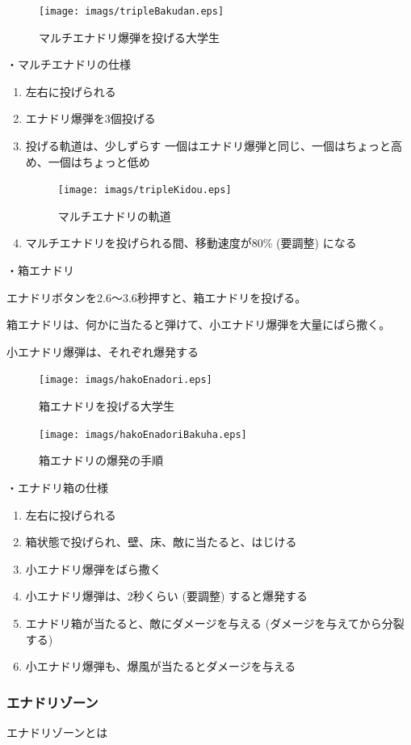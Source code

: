 \documentclass[12pt]{jsarticle}
\begin{document}
\begin{figure}[htbp]
  \begin{center}
    \texttt{[image: imags/tripleBakudan.eps]}
  \end{center}
  \caption{マルチエナドリ爆弾を投げる大学生}
\end{figure}

\newpage

・マルチエナドリの仕様
\begin{enumerate}
  \item 左右に投げられる
  \item エナドリ爆弾を3個投げる
  \item 投げる軌道は、少しずらす
  一個はエナドリ爆弾と同じ、一個はちょっと高め、一個はちょっと低め
  \begin{figure}[htbp]
    \begin{center}
      \texttt{[image: imags/tripleKidou.eps]}
    \end{center}
    \caption{マルチエナドリの軌道}
  \end{figure}
  \item マルチエナドリを投げられる間、移動速度が80\% (要調整) になる
\end{enumerate}

\newpage

・箱エナドリ

エナドリボタンを2.6〜3.6秒押すと、箱エナドリを投げる。

箱エナドリは、何かに当たると弾けて、小エナドリ爆弾を大量にばら撒く。

小エナドリ爆弾は、それぞれ爆発する

\begin{figure}[htbp]
  \begin{center}
    \texttt{[image: imags/hakoEnadori.eps]}
  \end{center}
  \caption{箱エナドリを投げる大学生}
\end{figure}

\begin{figure}[htbp]
  \begin{center}
    \texttt{[image: imags/hakoEnadoriBakuha.eps]}
  \end{center}
  \caption{箱エナドリの爆発の手順}
\end{figure}

\newpage

・エナドリ箱の仕様

\begin{enumerate}
  \item 左右に投げられる
  \item 箱状態で投げられ、壁、床、敵に当たると、はじける
  \item 小エナドリ爆弾をばら撒く
  \item 小エナドリ爆弾は、2秒くらい (要調整) すると爆発する
  \item エナドリ箱が当たると、敵にダメージを与える
  (ダメージを与えてから分裂する)
  \item 小エナドリ爆弾も、爆風が当たるとダメージを与える
\end{enumerate}

\newpage

\subsubsection{エナドリゾーン}

エナドリゾーンとは
\end{document}
